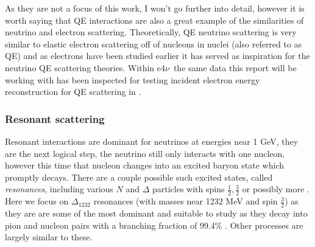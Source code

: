\documentclass[a4paper,12pt]{article}
\newcommand{\efn}{e4$\nu$}
\begin{document}
As they are not a focus of this work, I won't go further into detail, however it is worth saying that QE interactions are also a great example of the similarities of neutrino and electron scattering.
Theoretically, QE neutrino scattering is very similar to elastic electron scattering off of nucleons in nuclei (also referred to as QE) and as electrons have been studied earlier it has served as inspiration for the neutrino QE scattering theories.
Within \efn\ the same data this report will be working with has been inspected for testing incident electron energy reconstruction for QE scattering in \cite{khachatryanElectronbeamEnergyReconstruction2021}.

\subsubsection{Resonant scattering}
Resonant interactions are dominant for neutrinos at energies near 1 \si{GeV}, they are the next logical step, the neutrino still only interacts with one nucleon, however this time that nucleon changes into an excited baryon state which promptly decays.
There are a couple possible such excited states, called \emph{resonances}, including various $N$ and $\Delta$ particles with spins $\frac{1}{2}, \frac{3}{2}$ or possibly more \cite{leitnerElectronNeutrinonucleusScattering2009}.
Here we focus on $\Delta_{1232}$ resonances (with masses near 1232 \si{MeV} and spin $\frac{3}{2}$) as they are are some of the most dominant and suitable to study as they decay into pion and nucleon pairs with a branching fraction of 99.4\% \cite{particledatagroupReviewParticlePhysics2022}.
Other processes are largely similar to these.
\end{document}
